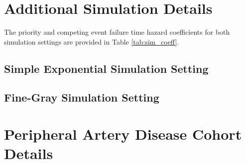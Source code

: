 

\section{Additional Simulation Details}
\label{sec:chp2_appendix1}

\ifnum{}
\ifnum{}
The priority and competing event failure time hazard coefficients for both simulation settings are provided in Table \ref{tab:sim_coeff}.

{
\fontsize{9}{12}\selectfont

\tableSimsCoeff
}
\fi
\fi

\subsection*{Simple Exponential Simulation Setting}

\subsection*{Fine-Gray Simulation Setting}


\section{Peripheral Artery Disease Cohort Details}
\label{sec:rda_appendix1}


%